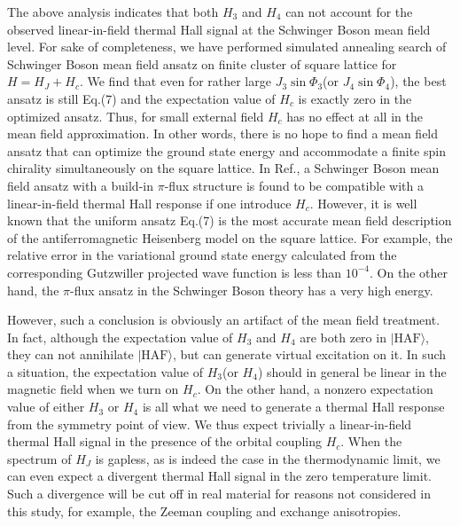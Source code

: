 \documentclass[prb,twocolumn,showpacs]{revtex4}
\begin{document}
The above analysis indicates that both $H_{3}$ and $H_{4}$ can not account for the observed linear-in-field thermal Hall signal at the Schwinger Boson mean field level. For sake of completeness, we have performed simulated annealing search of Schwinger Boson mean field ansatz on finite cluster of square lattice for $H=H_{J}+H_{c}$. We find that even for rather large $J_{3}\sin\Phi_{3}$(or $J_{4}\sin\Phi_{4}$), the best ansatz is still Eq.(7) and the expectation value of $H_{c}$ is exactly zero in the optimized ansatz. Thus, for small external field $H_{c}$ has no effect at all in the mean field approximation. In other words, there is no hope to find a mean field ansatz that can optimize the ground state energy and accommodate a finite spin chirality simultaneously on the square lattice. In Ref., a Schwinger Boson mean field ansatz with a build-in $\pi$-flux structure is found to be compatible with a linear-in-field thermal Hall response if one introduce $H_{c}$. However, it is well known that the uniform ansatz Eq.(7) is the most accurate mean field description of the antiferromagnetic Heisenberg model on the square lattice. For example, the relative error in the variational ground state energy calculated from the corresponding Gutzwiller projected wave function\cite{LDA} is less than $10^{-4}$. On the other hand, the $\pi$-flux ansatz in the Schwinger Boson theory has a very high energy\cite{Li1}.   

However, such a conclusion is obviously an artifact of the mean field treatment. In fact, although the expectation value of $H_{3}$ and $H_{4}$ are both zero in $|\mathrm{HAF}\rangle$, they can not annihilate  $|\mathrm{HAF}\rangle$,  but can generate virtual excitation on it. In such a situation, the expectation value of $H_{3}$(or $H_{4}$) should in general be linear in the magnetic field when we turn on $H_{c}$. On the other hand, a nonzero expectation value of either $H_{3}$ or $H_{4}$ is all what we need to generate a thermal Hall response from the symmetry point of view. We thus expect trivially a linear-in-field thermal Hall signal in the presence of the orbital coupling $H_{c}$. When the spectrum of $H_{J}$ is gapless, as is indeed the case in the thermodynamic limit, we can even expect a divergent thermal Hall signal in the zero temperature limit. Such a divergence will be cut off in real material for reasons not considered in this study, for example, the Zeeman coupling and exchange anisotropies.
\end{document}
